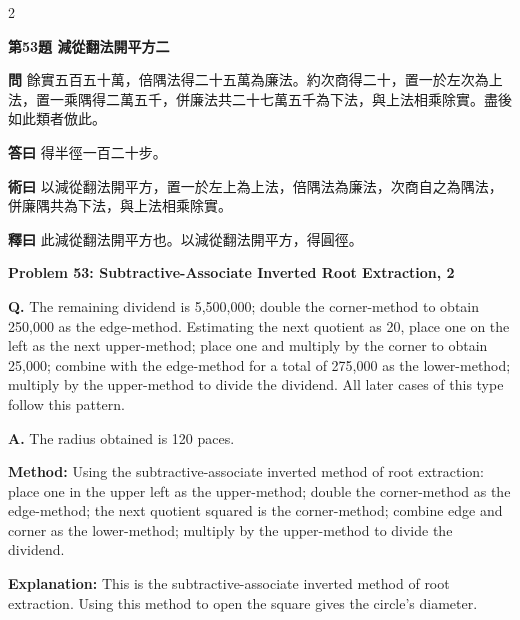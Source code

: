 \documentclass[11pt,a4paper]{article}
\newcommand{\wen}[1]{\noindent\textbf{問} #1\par\smallskip}
\newcommand{\da}[1]{\noindent\textbf{答曰} #1\par\smallskip}
\newcommand{\shu}[1]{\noindent\textbf{術曰} #1\par\smallskip}
\newcommand{\shi}[1]{\noindent\textbf{釋曰} #1\par\smallskip}
\newcommand{\wenE}[1]{\noindent\textbf{Q.} #1\par\smallskip}
\newcommand{\daE}[1]{\noindent\textbf{A.} #1\par\smallskip}
\newcommand{\shuE}[1]{\noindent\textbf{Method:} #1\par\smallskip}
\newcommand{\shiE}[1]{\noindent\textbf{Explanation:} #1\par\smallskip}
\begin{document}
\bigskip

\begin{paracol}{2}

\noindent\textbf{第53題 減從翻法開平方二}

\wen{餘實五百五十萬，倍隅法得二十五萬為廉法。約次商得二十，置一於左次為上法，置一乘隅得二萬五千，併廉法共二十七萬五千為下法，與上法相乘除實。盡後如此類者倣此。}
\da{得半徑一百二十步。}
\shu{以減從翻法開平方，置一於左上為上法，倍隅法為廉法，次商自之為隅法，併廉隅共為下法，與上法相乘除實。}
\shi{此減從翻法開平方也。以減從翻法開平方，得圓徑。}

\switchcolumn

\noindent\textbf{Problem 53: Subtractive-Associate Inverted Root Extraction, 2}

\wenE{The remaining dividend is 5,500,000; double the corner-method to obtain 250,000 as the edge-method. Estimating the next quotient as 20, place one on the left as the next upper-method; place one and multiply by the corner to obtain 25,000; combine with the edge-method for a total of 275,000 as the lower-method; multiply by the upper-method to divide the dividend. All later cases of this type follow this pattern.}
\daE{The radius obtained is 120 paces.}
\shuE{Using the subtractive-associate inverted method of root extraction: place one in the upper left as the upper-method; double the corner-method as the edge-method; the next quotient squared is the corner-method; combine edge and corner as the lower-method; multiply by the upper-method to divide the dividend.}
\shiE{This is the subtractive-associate inverted method of root extraction. Using this method to open the square gives the circle's diameter.}

\end{paracol}

\bigskip
\end{document}
